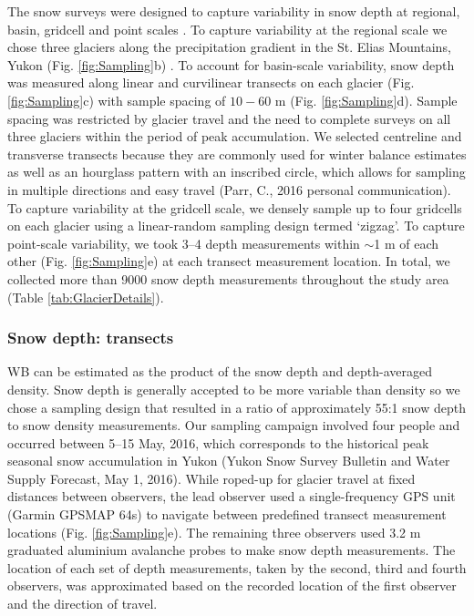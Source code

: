 \documentclass[twocolumn, letterpaper]{igs}
\begin{document}
The snow surveys were designed to capture variability in snow depth at regional, basin, gridcell and point scales \citep{Clark2011}. To capture variability at the regional scale we chose three glaciers along the precipitation gradient in the St. Elias Mountains, Yukon (Fig. \ref{fig:Sampling}b) \citep{Taylor1969}. To account for basin-scale variability, snow depth was measured along linear and curvilinear transects on each glacier (Fig. \ref{fig:Sampling}c) with sample spacing of $10-60$ m (Fig. \ref{fig:Sampling}d). Sample spacing was restricted by glacier travel and the need to complete surveys on all three glaciers within the period of peak accumulation. We selected centreline and transverse transects because they are commonly used for winter balance estimates \citep[e.g.][]{Kaser2003, Machguth2006} as well as an hourglass pattern with an inscribed circle, which allows for sampling in multiple directions and easy travel (Parr, C., 2016 personal communication). To capture variability at the gridcell scale, we densely sample up to four gridcells on each glacier using a linear-random sampling design termed `zigzag'. To capture point-scale variability, we took 3--4 depth measurements within $\sim$1 m of each other (Fig. \ref{fig:Sampling}e) at each transect measurement location. In total, we collected more than 9000 snow depth measurements throughout the study area (Table \ref {tab:GlacierDetails}). 

\subsubsection{Snow depth: transects}

WB can be estimated as the product of the snow depth and depth-averaged density. Snow depth is generally accepted to be more variable than density \citep{Elder1991, Clark2011, Lopez2013} so we chose a sampling design that resulted in a ratio of approximately 55:1 snow depth to snow density measurements. Our sampling campaign involved four people and occurred between 5--15 May, 2016, which corresponds to the historical peak seasonal snow accumulation in Yukon (Yukon Snow Survey Bulletin and Water Supply Forecast, May 1, 2016). While roped-up for glacier travel at fixed distances between observers, the lead observer used a single-frequency GPS unit (Garmin GPSMAP 64s) to navigate between predefined transect measurement locations (Fig. \ref{fig:Sampling}e). The remaining three observers used 3.2 m graduated aluminium avalanche probes to make snow depth measurements. The location of each set of depth measurements, taken by the second, third and fourth observers, was approximated based on the recorded location of the first observer and the direction of travel. 
\end{document}
